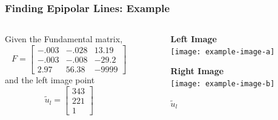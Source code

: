 \begin{frame}
    \frametitle{Finding Epipolar Lines: Example}
    
    \begin{columns}
        \begin{column}{0.45\textwidth} %
            Given the Fundamental matrix,
            \begin{equation*}
            F = \begin{bmatrix}
            -.003 & -.028 & 13.19 \\
            -.003 & -.008 & -29.2 \\
            2.97 & 56.38 & -9999
            \end{bmatrix}
            \end{equation*}
            and the left image point
            \begin{equation*}
            \tilde{u}_l = \begin{bmatrix}
            343 \\ 221 \\ 1
            \end{bmatrix}
            \end{equation*}
        \end{column}
        \begin{column}{0.55\textwidth} %
            \begin{figure}
                \centering
                \begin{minipage}{0.48\textwidth}
                    \centering
                    \textbf{Left Image} \\
                    \texttt{[image: example-image-a]} %
                    \caption*{$\tilde{u}_l$} %
                    \label{fig:left_image}
                \end{minipage}
                \hfill
                \begin{minipage}{0.48\textwidth}
                    \centering
                    \textbf{Right Image} \\
                    \texttt{[image: example-image-b]} %
                    \label{fig:right_image}
                \end{minipage}
            \end{figure}
        \end{column}
    \end{columns}


\end{frame}
